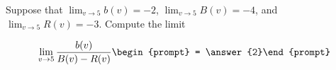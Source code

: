 \documentclass{ximera}
\author{Matthew Carr}
\begin{document}
\begin{exercise}
Suppose that $\lim_{v\to5}b(v)=-2$, $\lim_{v\to5}B(v)=-4$, and $\lim_{v\to5}R(v)=-3$. Compute the limit

\[
\lim_{v\to 5 } \frac{b(v)}{B(v)-R(v)}\begin{prompt} = \answer{2}\end{prompt}
\]
\end{exercise}
\end{document}
